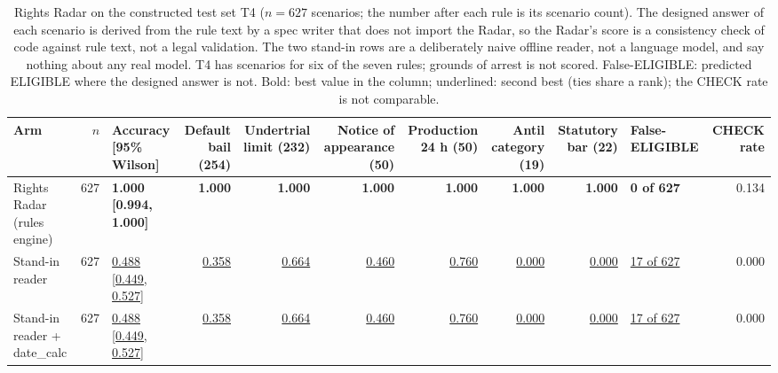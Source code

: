\begin{table}[t]
\centering\footnotesize
\begin{adjustbox}{max width=\textwidth}
\begin{tabular}{@{}lrlrrrrrrlr@{}}
\toprule
Arm & $n$ & Accuracy [95\% Wilson] & Default bail (254) & Undertrial limit (232) & Notice of appearance (50) & Production 24 h (50) & Antil category (19) & Statutory bar (22) & False-ELIGIBLE & CHECK rate \\
\midrule
Rights Radar (rules engine) & 627 & \textbf{1.000 [0.994, 1.000]} & \textbf{1.000} & \textbf{1.000} & \textbf{1.000} & \textbf{1.000} & \textbf{1.000} & \textbf{1.000} & \textbf{0 of 627} & 0.134 \\
Stand-in reader & 627 & \underline{0.488 [0.449, 0.527]} & \underline{0.358} & \underline{0.664} & \underline{0.460} & \underline{0.760} & \underline{0.000} & \underline{0.000} & \underline{17 of 627} & 0.000 \\
Stand-in reader + date\_calc & 627 & \underline{0.488 [0.449, 0.527]} & \underline{0.358} & \underline{0.664} & \underline{0.460} & \underline{0.760} & \underline{0.000} & \underline{0.000} & \underline{17 of 627} & 0.000 \\
\bottomrule
\end{tabular}
\end{adjustbox}
\caption{Rights Radar on the constructed test set T4 ($n=627$ scenarios; the number after each rule is its scenario count). The designed answer of each scenario is derived from the rule text by a spec writer that does not import the Radar, so the Radar's score is a consistency check of code against rule text, not a legal validation. The two stand-in rows are a deliberately naive offline reader, not a language model, and say nothing about any real model. T4 has scenarios for six of the seven rules; grounds of arrest is not scored. False-ELIGIBLE: predicted ELIGIBLE where the designed answer is not. Bold: best value in the column; underlined: second best (ties share a rank); the CHECK rate is not comparable.}
\label{tab:rights}
\end{table}
